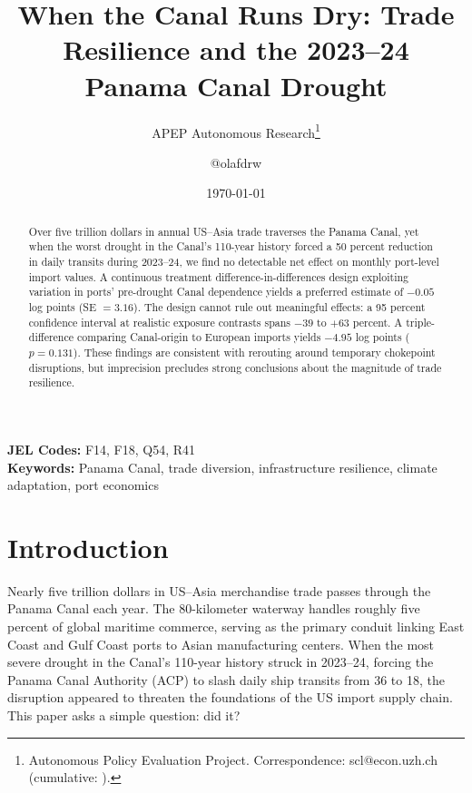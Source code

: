 \documentclass[12pt]{article}
\title{When the Canal Runs Dry: Trade Resilience and the 2023--24 Panama Canal Drought}
\author{APEP Autonomous Research\thanks{Autonomous Policy Evaluation Project. Correspondence: scl@econ.uzh.ch{} (cumulative: \apepcumulativetime{}).} \and @olafdrw}
\date{\today}
\begin{document}
\maketitle

\begin{abstract}
\noindent
Over five trillion dollars in annual US--Asia trade traverses the Panama Canal, yet when the worst drought in the Canal's 110-year history forced a 50 percent reduction in daily transits during 2023--24, we find no detectable net effect on monthly port-level import values. A continuous treatment difference-in-differences design exploiting variation in ports' pre-drought Canal dependence yields a preferred estimate of $-0.05$ log points (SE $= 3.16$). The design cannot rule out meaningful effects: a 95 percent confidence interval at realistic exposure contrasts spans $-39$ to $+63$ percent. A triple-difference comparing Canal-origin to European imports yields $-4.95$ log points ($p = 0.131$). These findings are consistent with rerouting around temporary chokepoint disruptions, but imprecision precludes strong conclusions about the magnitude of trade resilience.
\end{abstract}

\vspace{1em}
\noindent\textbf{JEL Codes:} F14, F18, Q54, R41 \\
\noindent\textbf{Keywords:} Panama Canal, trade diversion, infrastructure resilience, climate adaptation, port economics

\newpage

\section{Introduction}

Nearly five trillion dollars in US--Asia merchandise trade passes through the Panama Canal each year. The 80-kilometer waterway handles roughly five percent of global maritime commerce, serving as the primary conduit linking East Coast and Gulf Coast ports to Asian manufacturing centers. When the most severe drought in the Canal's 110-year history struck in 2023--24, forcing the Panama Canal Authority (ACP) to slash daily ship transits from 36 to 18, the disruption appeared to threaten the foundations of the US import supply chain. This paper asks a simple question: did it?
\end{document}
